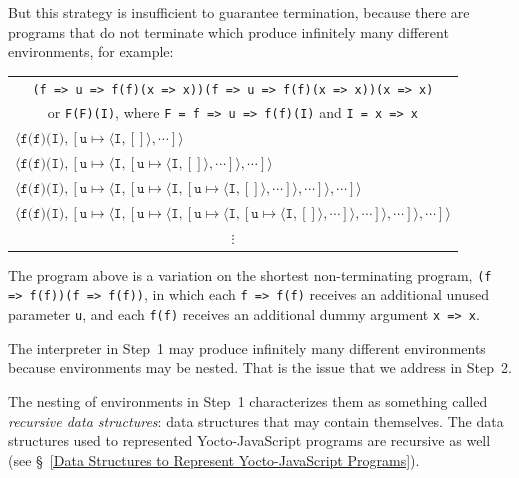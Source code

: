 \documentclass[12pt, oneside]{book}
\begin{document}
But this strategy is insufficient to guarantee termination, because there are programs that do not terminate which produce infinitely many different environments, for example:

\begin{center}
\begin{tabular}{l}
\multicolumn{1}{c}{\texttt{(f => u => f(f)(x => x))(f => u => f(f)(x => x))(x => x)}} \\
\multicolumn{1}{c}{or \texttt{F(F)(I)}, where \texttt{F = f => u => f(f)(I)} and \texttt{I = x => x}} \\
$\langle \texttt{f(f)(I)}, [\texttt{u} \mapsto \langle \texttt{I}, [] \rangle, \cdots] \rangle$ \\
$\langle \texttt{f(f)(I)}, [\texttt{u} \mapsto \langle \texttt{I}, [\texttt{u} \mapsto \langle \texttt{I}, [] \rangle, \cdots] \rangle, \cdots] \rangle$ \\
$\langle \texttt{f(f)(I)}, [\texttt{u} \mapsto \langle \texttt{I}, [\texttt{u} \mapsto \langle \texttt{I}, [\texttt{u} \mapsto \langle \texttt{I}, [] \rangle, \cdots] \rangle, \cdots] \rangle, \cdots] \rangle$ \\
$\langle \texttt{f(f)(I)}, [\texttt{u} \mapsto \langle \texttt{I}, [\texttt{u} \mapsto \langle \texttt{I}, [\texttt{u} \mapsto \langle \texttt{I}, [\texttt{u} \mapsto \langle \texttt{I}, [] \rangle, \cdots] \rangle, \cdots] \rangle, \cdots] \rangle, \cdots] \rangle$ \\
\multicolumn{1}{c}{$\vdots$} \\
\end{tabular}
\end{center}

The program above is a variation on the shortest non-terminating program, \texttt{(f => f(f))(f => f(f))}, in which each \texttt{f => f(f)} receives an additional unused parameter \texttt{u}, and each \texttt{f(f)} receives an additional dummy argument \texttt{x => x}.

The interpreter in Step~1 may produce infinitely many different environments because environments may be nested. That is the issue that we address in Step~2.

\begin{mdframed}[frametitle = {Technical Terms}]
The nesting of environments in Step~1 characterizes them as something called \emph{recursive data structures}: data structures that may contain themselves. The data structures used to represented Yocto-JavaScript programs are recursive as well (see §~\ref{Data Structures to Represent Yocto-JavaScript Programs}).
\end{mdframed}
\end{document}
